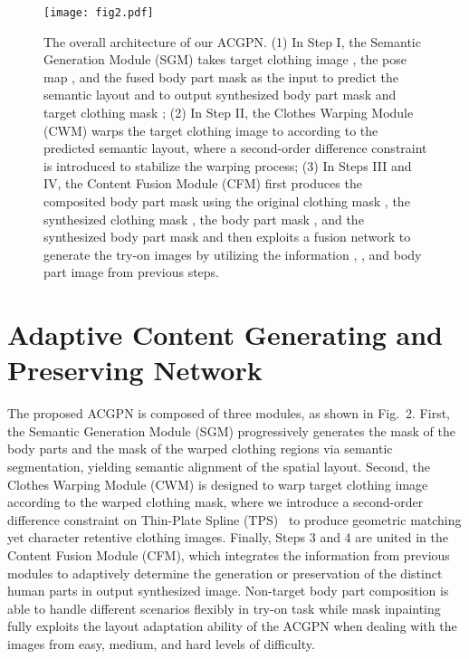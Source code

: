 \documentclass[10pt,twocolumn,letterpaper]{article}
\begin{document}
\begin{figure*}[t]
\begin{center}
\texttt{[image: fig2.pdf]}
\vspace{-10pt}
\end{center}
   \caption{\footnotesize The overall architecture of our ACGPN. (1) In Step I, the Semantic Generation Module (SGM) takes target clothing  image , the pose map , and the fused body part mask  as the input to predict the semantic layout and to output synthesized body part mask  and target clothing mask ; (2) In Step II, the Clothes Warping Module (CWM) warps the target clothing  image to  according to the predicted semantic layout, where a second-order difference constraint is introduced to stabilize the warping process; (3) In Steps III and IV, the Content Fusion Module (CFM) first produces  the composited body part mask  using the original clothing mask , the synthesized clothing mask , the body part mask , and the synthesized body part mask  and then exploits a fusion network to generate the try-on images  by utilizing the information , , and body part image  from previous steps.}
\label{fig:2}
\vspace{-10pt}
\end{figure*}

\section{Adaptive Content Generating and Preserving Network}
The proposed ACGPN is composed of three modules, as shown in Fig.~2. First, the Semantic Generation Module (SGM)  progressively generates the mask of the body parts and the mask of the warped clothing regions via semantic segmentation, yielding semantic alignment of the spatial layout.
Second, the Clothes Warping Module (CWM) is designed to warp target clothing  image according to the warped clothing mask, where we introduce a second-order difference constraint on Thin-Plate Spline (TPS)~\cite{duchon1977splines}  to produce geometric matching yet character retentive clothing  images.
Finally, Steps 3 and 4 are united in the Content Fusion Module (CFM), which integrates the information from previous modules to adaptively determine the generation or preservation of the distinct human parts in output synthesized image. Non-target body part composition is able to handle different scenarios flexibly in try-on task while mask inpainting fully exploits the layout adaptation ability of the ACGPN when dealing with the images from easy, medium, and hard levels of difficulty.
\end{document}
